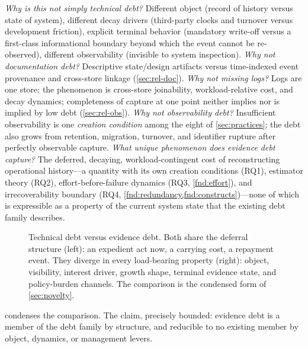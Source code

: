 \emph{Why is this not simply technical debt?} Different object (record of history
versus state of system), different decay drivers (third-party clocks and turnover
versus development friction), explicit terminal behavior (mandatory write-off
versus a first-class informational boundary beyond which the event cannot be
re-observed), different observability (invisible to system
inspection). \emph{Why not documentation debt?} Descriptive state/design artifacts
versus time-indexed event provenance and cross-store linkage
(\cref{sec:rel-doc}). \emph{Why
not missing logs?} Logs are one store; the phenomenon is cross-store joinability,
workload-relative cost, and decay dynamics; completeness of capture at one point
neither implies nor is implied by low debt (\cref{sec:rel-obs}). \emph{Why not
observability debt?} Insufficient observability is one \emph{creation condition}
among the eight of \cref{sec:practices}; the debt also grows from retention,
migration, turnover, and identifier rupture after perfectly observable capture.
\emph{What unique phenomenon does evidence debt capture?} The deferred,
decaying, workload-contingent cost of reconstructing operational history---a
quantity with its own creation conditions (RQ1), estimator theory (RQ2),
effort-before-failure dynamics (RQ3, \cref{fnd:effort}), and irrecoverability
boundary (RQ4, \cref{fnd:redundancy,fnd:constructs})---none of which is expressible as a
property of the current system state that the existing debt family describes.

\begin{figure}[t]
\centering
\resizebox{\columnwidth}{!}{}
\caption{Technical debt versus evidence debt. Both share the deferral structure
(left): an expedient act now, a carrying cost, a repayment event. They diverge in
every load-bearing property (right): object, visibility, interest driver, growth
shape, terminal evidence state, and policy-burden channels. The comparison is the condensed form
of \cref{sec:novelty}.}
\label{fig:tdvsed}
\end{figure}

 condenses the comparison. The claim, precisely bounded: evidence
debt is a member of the debt family by structure, and reducible to no existing
member by object, dynamics, or management levers.
